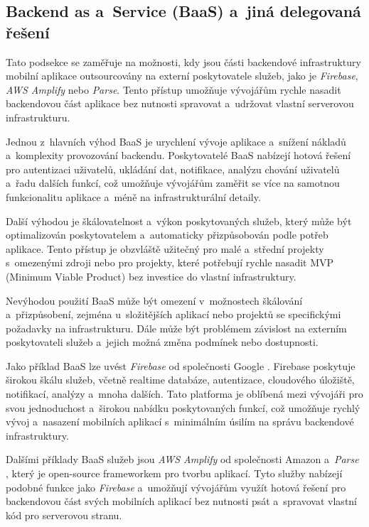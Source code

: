 \subsection{Backend as a~Service (BaaS) a~jiná delegovaná řešení}\label{baas}

Tato podsekce se zaměřuje na možnosti, kdy jsou části backendové infrastruktury mobilní aplikace outsourcovány na externí poskytovatele služeb, jako je \emph{Firebase}, \emph{AWS Amplify} nebo \emph{Parse}. Tento přístup umožňuje vývojářům rychle nasadit backendovou část aplikace bez nutnosti spravovat a~udržovat vlastní serverovou infrastrukturu.

Jednou z~hlavních výhod BaaS je urychlení vývoje aplikace a~snížení nákladů a~komplexity provozování backendu. Poskytovatelé BaaS nabízejí hotová řešení pro autentizaci uživatelů, ukládání dat, notifikace, analýzu chování uživatelů a~řadu dalších funkcí, což umožňuje vývojářům zaměřit se více na samotnou funkcionalitu aplikace a~méně na infrastrukturální detaily.

Další výhodou je škálovatelnost a~výkon poskytovaných služeb, který může být optimalizován poskytovatelem a~automaticky přizpůsobován podle potřeb aplikace. Tento přístup je obzvláště užitečný pro malé a~střední projekty s~omezenými zdroji nebo pro projekty, které potřebují rychle nasadit MVP (Minimum Viable Product) bez investice do vlastní infrastruktury.

Nevýhodou použití BaaS může být omezení v~možnostech škálování a~přizpůsobení, zejména u~složitějších aplikací nebo projektů se specifickými požadavky na infrastrukturu. Dále může být problémem závislost na externím poskytovateli služeb a~jejich možná změna podmínek nebo dostupnosti.

Jako příklad BaaS lze uvést \emph{Firebase} od společnosti Google \cite{firebase}. Firebase poskytuje širokou škálu služeb, včetně realtime databáze, autentizace, cloudového úložiště, notifikací, analýzy a~mnoha dalších. Tato platforma je oblíbená mezi vývojáři pro svou jednoduchost a~širokou nabídku poskytovaných funkcí, což umožňuje rychlý vývoj a~nasazení mobilních aplikací s~minimálním úsilím na správu backendové infrastruktury.

Dalšími příklady BaaS služeb jsou \emph{AWS Amplify} od společnosti Amazon \cite{aws-amplify} a~\emph{Parse} \cite{parse}, který je open-source frameworkem pro tvorbu aplikací. Tyto služby nabízejí podobné funkce jako \emph{Firebase} a~umožňují vývojářům využít hotová řešení pro backendovou část svých mobilních aplikací bez nutnosti psát a~spravovat vlastní kód pro serverovou stranu.

